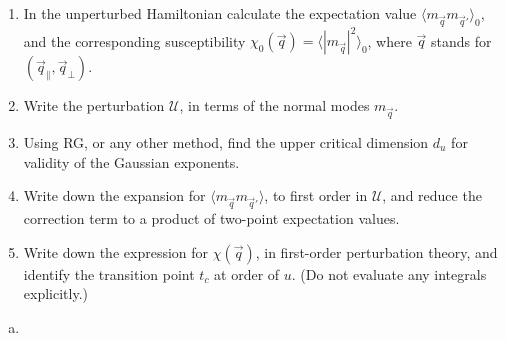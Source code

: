 \begin{problem}
\begin{enumerate}
        \item[(f)] In the unperturbed Hamiltonian calculate the expectation value $\langle m_{\vec{q}}m_{\vec{q}'}\rangle_0$, and the corresponding susceptibility $\chi_0(\vec{q}) = \langle|m_{\vec{q}}|^2\rangle_0$, where $\vec{q}$ stands for $(\vec{q}_\parallel, \vec{q}_\perp)$.

        \item[(g)] Write the perturbation $\mathcal{U}$, in terms of the normal modes $m_{\vec{q}}$.

        \item[(h)] Using RG, or any other method, find the upper critical dimension $d_u$ for validity of the Gaussian exponents.

        \item[(i)] Write down the expansion for $\langle m_{\vec{q}}m_{\vec{q}'}\rangle$, to first order in $\mathcal{U}$, and reduce the correction term to a product of two-point expectation values.

        \item[(j)] Write down the expression for $\chi(\vec{q})$, in first-order perturbation theory, and identify the transition point $t_c$ at order of $u$. (Do not evaluate any integrals explicitly.)
    \end{enumerate}
\end{problem}

\begin{solution}
    \begin{enumerate}[(a)]
        \item
    \end{enumerate}
\end{solution}

